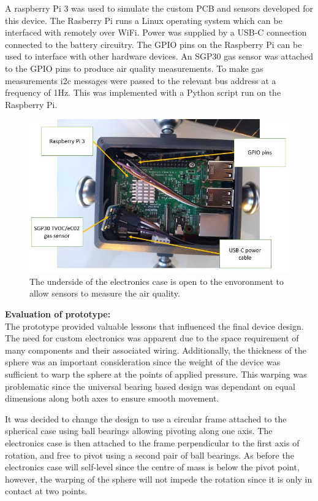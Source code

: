 A raspberry Pi 3 was used to simulate the custom PCB and sensors developed for this device. The Rasberry Pi runs a Linux operating system which can be interfaced with remotely over WiFi. Power was supplied by a USB-C connection connected to the battery circuitry. The GPIO pins on the Raspberry Pi can be used to interface with other hardware devices. An SGP30 gas sensor was attached to the GPIO pins to produce air quality measurements. To make gas measurements i2c messages were passed to the relevant bus address at a frequency of 1Hz. This was implemented with a Python script run on the Raspberry Pi.

\begin{figure}[H]
\centering
\includegraphics[width=0.5\linewidth]{Engineering_hardware/Engineering_hardware_Figures/prototype_pic_2.JPG}
\caption{The underside of the electronics case is open to the envoronment to allow sensors to measure the air quality.}
\label{fig:15cm_shell_loading}
\end{figure}




\textbf{Evaluation of prototype:}\\
The prototype provided valuable lessons that influenced the final device design. The need for custom electronics was apparent due to the space requirement of many components and their associated wiring. Additionally, the thickness of the sphere was an important consideration since the weight of the device was sufficient to warp the sphere at the points of applied pressure. This warping was problematic since the universal bearing based design was dependant on equal dimensions along both axes to ensure smooth movement.

It was decided to change the design to use a circular frame attached to the spherical case using ball bearings allowing pivoting along one axis. The electronics case is then attached to the frame perpendicular to the first axis of rotation, and free to pivot using a second pair of ball bearings. As before the electronics case will self-level since the centre of mass is below the pivot point, however, the warping of the sphere will not impede the rotation since it is only in contact at two points.

